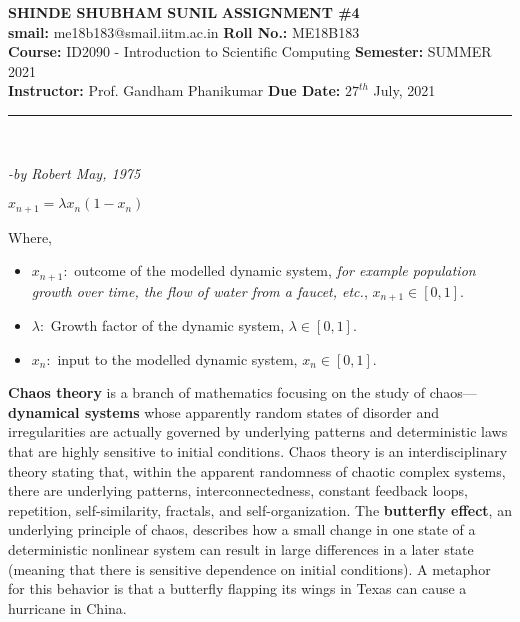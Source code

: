 \documentclass[a4paper, 11pt]{article}
\newenvironment{The Chaos Theory}[2][\centerline{\huge The Chaos Theory}]
    { \begin{mdframed}[backgroundcolor=gray!20] \textbf{#1 #2} \\}
    {  \end{mdframed}}
\begin{document}
\noindent
\large\textbf{SHINDE SHUBHAM SUNIL} \hfill \textbf{ASSIGNMENT \#4}   \\
\textbf{smail:} me18b183@smail.iitm.ac.in \hfill \textbf{Roll No.:} ME18B183 \\
\normalsize\textbf {Course:} ID2090 - Introduction to Scientific Computing \hfill \textbf{Semester:} SUMMER 2021 \\
\textbf{Instructor:} Prof. Gandham Phanikumar \hfill \textbf{Due Date:} $27^{th}$ July, 2021 \\
\noindent\rule{7in}{2.5pt}
\begin{The Chaos Theory}\\
\centerline{\textit{-by Robert May, 1975}}
\end{The Chaos Theory}
\begin{center}
\centerline{\huge $x_{n+1}=\lambda x_n(1-x_n)$}
\end{center}
Where,
\begin{itemize}
    \item $x_{n+1}:$ outcome of the modelled dynamic system, \textit{for example population growth over time, the flow of water from a faucet, etc.}, $x_{n+1}\in[0,1]$.
    \item $\lambda:$ Growth factor of the dynamic system, $\lambda\in [0,1]$.
    \item $x_n:$ input to the modelled dynamic system, $x_{n}\in[0,1]$.  
\end{itemize}
\textbf{Chaos theory} is a branch of mathematics focusing on the study of chaos—\textbf{dynamical systems} whose apparently random states of disorder and irregularities are actually governed by underlying patterns and deterministic laws that are highly sensitive to initial conditions. Chaos theory is an interdisciplinary theory stating that, within the apparent randomness of chaotic complex systems, there are underlying patterns, interconnectedness, constant feedback loops, repetition, self-similarity, fractals, and self-organization. The \textbf{butterfly effect}, an underlying principle of chaos, describes how a small change in one state of a deterministic nonlinear system can result in large differences in a later state (meaning that there is sensitive dependence on initial conditions). A metaphor for this behavior is that a butterfly flapping its wings in Texas can cause a hurricane in China.
\end{document}
